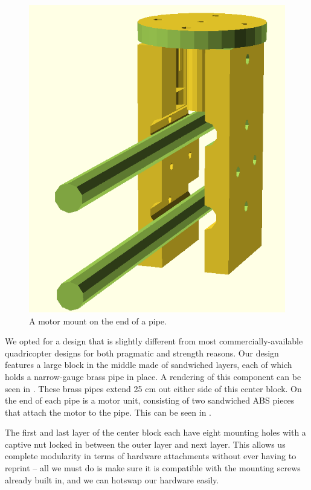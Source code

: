 \begin{figure}[htb]
  \centering
  \includegraphics[scale=0.4]{figures/fred}
  \caption{A motor mount on the end of a pipe.}
  \label{fig:fred}
\end{figure}

We opted for a design that is slightly different from most
commercially-available quadricopter designs for both pragmatic and
strength reasons. Our design features a large block in the middle made
of sandwiched layers, each of which holds a narrow-gauge brass pipe in
place. A rendering of this component can be seen in
. These brass pipes extend 25 cm out either side of this
center block. On the end of each pipe is a motor unit, consisting of
two sandwiched ABS pieces that attach the motor to the pipe. This can
be seen in .

The first and last layer of the center block each have eight mounting
holes with a captive nut locked in between the outer layer and next
layer. This allows us complete modularity in terms of hardware
attachments without ever having to reprint -- all we must do is
make sure it is compatible with the mounting screws already built in,
and we can hotswap our hardware easily.

